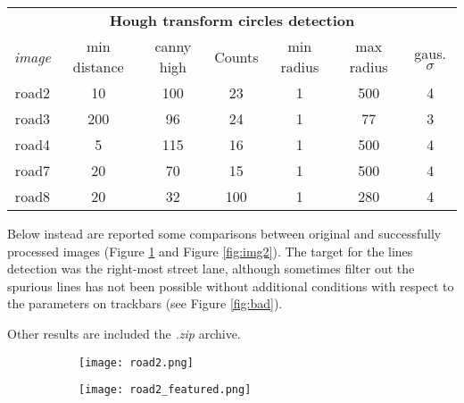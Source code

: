 \documentclass[11pt,a4paper]{article}
\begin{document}
\begin{table}
	\begin{center}
		\begin{tabular}{ccccccc}
			\hline
			              \multicolumn{7}{c}{\textbf{Hough transform circles detection}}               \\
			\textit{image} & min distance & canny high & Counts & min radius & max radius & gaus. $\sigma$ \\ \hline
			  road2    &      10      &    100     &   23   &     1      &    500     &       4        \\
			  road3    &     200      &     96     &   24   &     1      &     77     &       3        \\
			  road4    &      5       &    115     &   16   &     1      &    500     &       4        \\
			  road7    &      20      &     70     &   15   &     1      &    500     &       4        \\
			  road8    &      20      &     32     &  100   &     1      &    280     &       4        \\ \hline
		\end{tabular}
	\end{center}
	\caption{}
	\label{tab:circles}
\end{table} 

Below instead are reported some comparisons between original and successfully processed images (Figure \ref{fig:img1} and Figure \ref{fig:img2}). The target for the lines detection was the right-most street lane, although sometimes filter out the spurious lines has not been possible without additional conditions with respect to the parameters on trackbars (see Figure \ref{fig:bad}).

Other results are included the \textit{.zip} archive.

\begin{figure}[h]
	\centering
	\begin{subfigure}{1\textwidth}
		\texttt{[image: road2.png]}
	\end{subfigure}%
    \hfill
    \vspace{10pt}
	\begin{subfigure}{1\textwidth}
		\texttt{[image: road2\_featured.png]}
	\end{subfigure}
	\hfill
	\vspace{10pt}
	\caption{ }
	\label{fig:img1}
\end{figure}
\end{document}
